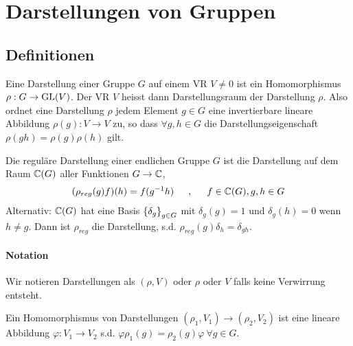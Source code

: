 \section{Darstellungen von Gruppen}

\subsection{Definitionen}

\begin{definition}[Darstellung]
    Eine Darstellung einer Gruppe $G$ auf einem VR $V \neq 0$ ist ein Homomorphismus
    $\rho: G \rightarrow \text{GL}(V)$. Der VR $V$ heisst dann Darstellungsraum
    der Darstellung $\rho$. Also ordnet eine Darstellung $\rho$ jedem Element
    $g \in G$ eine invertierbare lineare Abbildung $\rho(g): V \rightarrow V$
    zu, so dass $\forall g,h \in G$ die Darstellungseigenschaft
    $\rho(g h) = \rho(g) \rho(h)$ gilt.
\end{definition}

\begin{definition}
    Die reguläre Darstellung einer endlichen Gruppe $G$ ist die Darstellung
    auf dem Raum $\mathbb{C}(G)$ aller Funktionen $G \rightarrow \mathbb{C}$,
    \begin{align*}
        (\rho_{reg}(g)f)(h) = f(g^{-1} h)
        \hspace{15pt} , \hspace{15pt}
        f \in \mathbb{C}(G) , g,h \in G
    \end{align*}
    Alternativ: $\mathbb{C}(G)$ hat eine Basis $\left\{ \delta_g \right\}_{g \in G}$ mit
    $\delta_g(g) = 1$ und $\delta_g(h) = 0$ wenn $h \neq g$. Dann ist
    $\rho_{reg}$ die Darstellung, s.d. $\rho_{reg}(g) \delta_h = \delta_{gh}$.
\end{definition}

\paragraph{Notation}
Wir notieren Darstellungen als $(\rho,V)$ oder $\rho$ oder $V$ falls keine
Verwirrung entsteht.

\begin{definition}
    Ein Homomorphismus von Darstellungen $(\rho_1,V_1) \rightarrow (\rho_2,V_2)$
    ist eine lineare Abbildung $\varphi: V_1 \rightarrow V_2$ s.d.
    $\varphi \rho_1(g) = \rho_2(g)\varphi \ \forall g \in G$.
\end{definition}

